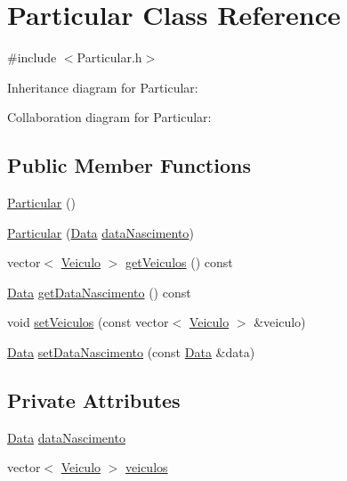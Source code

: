 \hypertarget{class_particular}{\section{Particular Class Reference}
\label{class_particular}
}


{\ttfamily \#include $<$Particular.\+h$>$}



Inheritance diagram for Particular\+:


Collaboration diagram for Particular\+:
\subsection*{Public Member Functions}
\begin{DoxyCompactItemize}
\item 
\hyperlink{class_particular_ac348d7cd078bbc184cf12f7ac8c7e589}{Particular} ()
\item 
\hyperlink{class_particular_abca8f23b90194f4f375083c8492e16d9}{Particular} (\hyperlink{class_data}{Data} \hyperlink{class_particular_ac1e89ce3d018c9d22249bdd0393988a8}{data\+Nascimento})
\item 
vector$<$ \hyperlink{class_veiculo}{Veiculo} $>$ \hyperlink{class_particular_afc0922a4d4e838590e8e125463cf1359}{get\+Veiculos} () const 
\item 
\hyperlink{class_data}{Data} \hyperlink{class_particular_abca7b66ae807bf92634beedb2a2a7715}{get\+Data\+Nascimento} () const 
\item 
void \hyperlink{class_particular_a79113f331cf3298260cd78cef05473c2}{set\+Veiculos} (const vector$<$ \hyperlink{class_veiculo}{Veiculo} $>$ \&veiculo)
\item 
\hyperlink{class_data}{Data} \hyperlink{class_particular_a5651a688db9efc92ae13a3ece5414077}{set\+Data\+Nascimento} (const \hyperlink{class_data}{Data} \&data)
\end{DoxyCompactItemize}
\subsection*{Private Attributes}
\begin{DoxyCompactItemize}
\item 
\hyperlink{class_data}{Data} \hyperlink{class_particular_ac1e89ce3d018c9d22249bdd0393988a8}{data\+Nascimento}
\item 
vector$<$ \hyperlink{class_veiculo}{Veiculo} $>$ \hyperlink{class_particular_a59ecc721e0a2f083d5bc1b4fab84f31c}{veiculos}
\end{DoxyCompactItemize}
